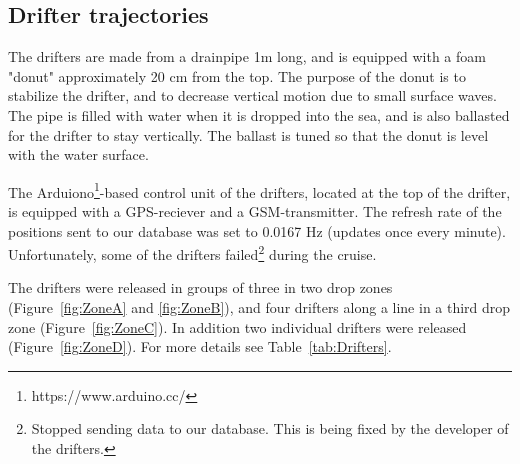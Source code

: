 \documentclass[12pt,a4paper,english]{article}
\begin{document}
\subsection{Drifter trajectories}
The drifters are made from a drainpipe 1m long, and is equipped with a foam "donut" approximately 20 cm from the top. The purpose of the donut is to stabilize the drifter, and to decrease vertical motion due to small surface waves. The pipe is filled with water when it is dropped into the sea, and is also ballasted for the drifter to stay vertically. The ballast is tuned so that the donut is level with the water surface.

The Arduiono\footnote{https://www.arduino.cc/}-based control unit of the drifters, located at the top of the drifter, is equipped with a GPS-reciever and a GSM-transmitter. The refresh rate of the positions sent to our database was set to 0.0167 Hz (updates once every minute). Unfortunately, some of the drifters failed\footnote{Stopped sending data to our database. This is being fixed by the developer of the drifters.} during the cruise.

The drifters were released in groups of three in two drop zones (Figure~\ref{fig:ZoneA} and \ref{fig:ZoneB}), and four drifters along a line in a third drop zone (Figure~\ref{fig:ZoneC}). In addition two individual drifters were released (Figure~\ref{fig:ZoneD}). For more details see Table~\ref{tab:Drifters}.
\end{document}
